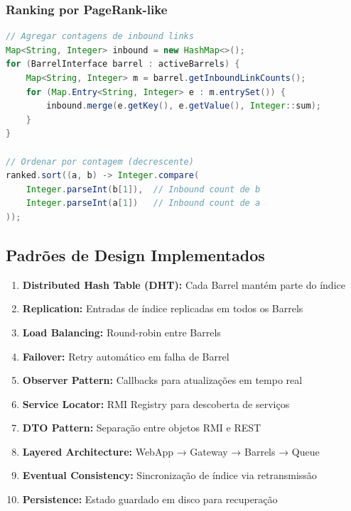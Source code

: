 \documentclass[12pt,a4paper]{article}
\begin{document}
\subsubsection{Ranking por PageRank-like}
\begin{lstlisting}[language=Java, caption={Algoritmo de ranking}]
// Agregar contagens de inbound links
Map<String, Integer> inbound = new HashMap<>();
for (BarrelInterface barrel : activeBarrels) {
    Map<String, Integer> m = barrel.getInboundLinkCounts();
    for (Map.Entry<String, Integer> e : m.entrySet()) {
        inbound.merge(e.getKey(), e.getValue(), Integer::sum);
    }
}

// Ordenar por contagem (decrescente)
ranked.sort((a, b) -> Integer.compare(
    Integer.parseInt(b[1]),  // Inbound count de b
    Integer.parseInt(a[1])   // Inbound count de a
));
\end{lstlisting}

\subsection{Padrões de Design Implementados}

\begin{enumerate}
    \item \textbf{Distributed Hash Table (DHT):} Cada Barrel mantém parte do índice
    \item \textbf{Replication:} Entradas de índice replicadas em todos os Barrels
    \item \textbf{Load Balancing:} Round-robin entre Barrels
    \item \textbf{Failover:} Retry automático em falha de Barrel
    \item \textbf{Observer Pattern:} Callbacks para atualizações em tempo real
    \item \textbf{Service Locator:} RMI Registry para descoberta de serviços
    \item \textbf{DTO Pattern:} Separação entre objetos RMI e REST
    \item \textbf{Layered Architecture:} WebApp → Gateway → Barrels → Queue
    \item \textbf{Eventual Consistency:} Sincronização de índice via retransmissão
    \item \textbf{Persistence:} Estado guardado em disco para recuperação
\end{enumerate}

\newpage

\end{document}
